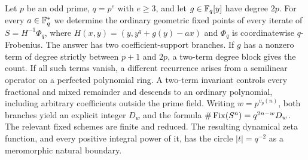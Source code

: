 Let $p$ be an odd prime, $q=p^e$ with $e\ge3$, and let
$g\in\mathbb F_q[y]$ have degree $2p$. For every $a\in\mathbb F_q^*$ we determine
the ordinary geometric fixed points of every iterate of
$S=H^{-1}\Phi_q$, where $H(x,y)=(y,y^q+g(y)-ax)$ and $\Phi_q$ is
coordinatewise $q$-Frobenius. The answer has two coefficient-support
branches. If $g$ has a nonzero term of degree strictly between $p+1$
and $2p$, a two-term degree block gives the count. If all such terms
vanish, a different recurrence arises from a semilinear operator on
a perfected polynomial ring. A two-term invariant controls every
fractional and mixed remainder and descends to an ordinary polynomial,
including arbitrary coefficients outside the prime field. Writing
$w=p^{v_p(n)}$, both branches yield an explicit integer $D_w$ and the
formula $\#\operatorname{Fix}(S^n)=q^{2n-w}D_w$. The relevant fixed schemes are
finite and reduced. The resulting dynamical zeta function, and every
positive integral power of it, has the circle $|t|=q^{-2}$ as a
meromorphic natural boundary.

